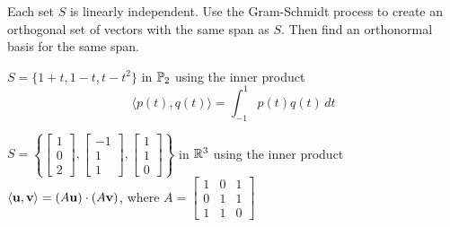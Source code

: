 	\ea
	
\item Each set $S$ is linearly independent. Use the Gram-Schmidt process to create an orthogonal set of vectors with the same span as $S$. Then find an orthonormal basis for the same span. 
	\ba
	\item $S = \{1+t, 1-t, t-t^2\}$ in $\mathbb{P}_2$ using the inner product 
\[\langle p(t), q(t) \rangle = \int_{-1}^1 p(t) q(t) \, dt\]

	\item $S = \left\{\left[ \begin{array}{c} 1\\0\\2 \end{array} \right], \left[ \begin{array}{r} -1\\1\\1 \end{array} \right], \left[ \begin{array}{c} 1\\1\\0 \end{array} \right] \right\}$ in $\mathbb{R}^3$ using the inner product $\langle \mathbf{u}, \mathbf{v} \rangle = (A\mathbf{u}) \cdot (A\mathbf{v})$, where $A = \left[ \begin{array}{ccc} 1&0&1 \\ 0&1&1\\1&1&0 \end{array} \right]$

